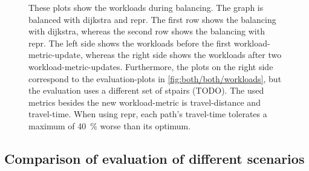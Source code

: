         \begin{figure}[hb]
            \centering%
            \hfill%

            \hfill%
            \caption[Workloads during balancing in comparison]{%
                These plots show the workloads during \gls{balancing}.
                The graph is balanced with \gls{dijkstra} and \gls{repr}.
                The first row shows the \gls{balancing} with \gls{dijkstra}, whereas the second row shows the \gls{balancing} with \gls{repr}.
                The left side shows the workloads before the first workload-\gls{metric}-update, whereas the right side shows the workloads after two workload-\gls{metric}-updates.
                Furthermore, the plots on the right side correspond to the evaluation-plots in \vref{fig:both/both/workloads}, but the evaluation uses a different set of \glspl{stpair} (TODO).
                The used \glspl{metric} besides the new workload-\gls{metric} is travel-distance and travel-time.
                When using \gls{repr}, each path's travel-time tolerates a maximum of \si{\num{40} \percent} worse than its optimum.
                \label{fig:both/2/workloads}
            }
        \end{figure}

    \subsection{Comparison of evaluation of different scenarios}

